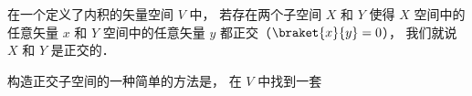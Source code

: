 

在一个定义了内积的矢量空间 $V$ 中， 若存在两个子空间 $X$ 和 $Y$ 使得 $X$ 空间中的任意矢量 $x$ 和 $Y$ 空间中的任意矢量 $y$ 都正交（$\braket{x}{y} = 0$）， 我们就说 $X$ 和 $Y$ 是正交的．

构造正交子空间的一种简单的方法是， 在 $V$ 中找到一套